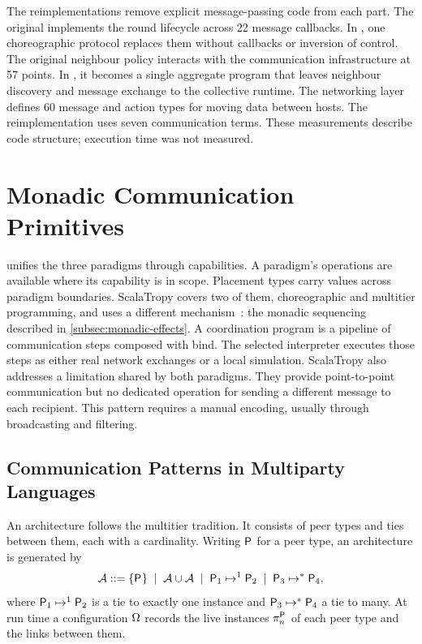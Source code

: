 The reimplementations remove explicit message-passing code from each part.
%
The original implements the round lifecycle across 22 message callbacks.
In \camil, one choreographic protocol replaces them without callbacks or inversion of control.
%
The original neighbour policy interacts with the communication infrastructure at 57 points.
In \camil, it becomes a single aggregate program that leaves neighbour discovery and message exchange to the collective runtime.
%
The networking layer defines 60 message and action types for moving data between hosts.
The reimplementation uses seven communication terms.
%
These measurements describe code structure; execution time was not measured.

\section{Monadic Communication Primitives}
\label{sec:scalatropy}

\camil unifies the three paradigms through capabilities.
A paradigm's operations are available where its capability is in scope.
Placement types carry values across paradigm boundaries.
%
ScalaTropy covers two of them, choreographic and multitier programming, and uses a different mechanism~\cite{Farabegoli:2026:ScalaTropy}:
the monadic sequencing described in \cref{subsec:monadic-effects}.
%
A coordination program is a pipeline of communication steps composed with bind.
The selected interpreter executes those steps as either real network exchanges or a local simulation.
%
ScalaTropy also addresses a limitation shared by both paradigms.
They provide point-to-point communication but no dedicated operation for sending a different message to each recipient.
This pattern requires a manual encoding, usually through broadcasting and filtering.

\subsection{Communication Patterns in Multiparty Languages}
\label{subsec:communication-patterns}

An architecture follows the multitier tradition.
It consists of peer types and ties between them, each with a cardinality.
%
Writing $\pfam$ for a peer type, an architecture is generated by
\[
    \arch ::= \{\pfam\} \;\mid\; \arch \cup \arch \;\mid\; \tieSingle{\pfam[1]}{\pfam[2]} \;\mid\; \tieMult{\pfam[3]}{\pfam[4]},
\]
where $\tieSingle{\pfam[1]}{\pfam[2]}$ is a tie to exactly one instance and $\tieMult{\pfam[3]}{\pfam[4]}$ a tie to many.
%
At run time a configuration $\peerconf$ records the live instances $\peerinst[n]{\pfam}$ of each peer type and the links between them.

